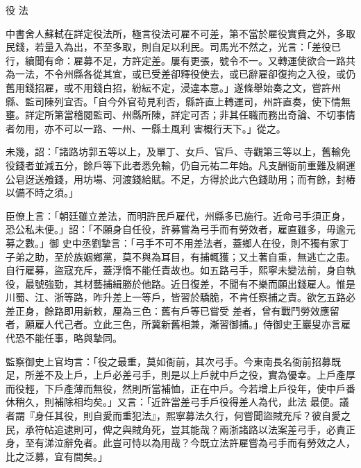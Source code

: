 
\begin{pinyinscope}

 役
 法



 中書舍人蘇軾在詳定役法所，極言役法可雇不可差，第不當於雇役實費之外，多取民錢，若量入為出，不至多取，則自足以利民。司馬光不然之，光言：「差役已
 行，續聞有命：雇募不足，方許定差。屢有更張，號令不一。又轉運使欲合一路共為一法，不令州縣各從其宜，或已受差卻釋役使去，或已辭雇卻復拘之入役，或仍舊用錢招雇，或不用錢白招，紛紜不定，浸違本意。」遂條舉始奏之文，嘗許州縣、監司陳列宜否。「自今外官茍見利否，縣許直上轉運司，州許直奏，使下情無壅。詳定所第當稽閱監司、州縣所陳，詳定可否；非其任職而務出奇論、不切事情者勿用，亦不可以一路、一州、一縣土風利
 害概行天下。」從之。



 未幾，詔：「諸路坊郭五等以上，及單丁、女戶、官戶、寺觀第三等以上，舊輸免役錢者並減五分，餘戶等下此者悉免輸，仍自元祐二年始。凡支酬衙前重難及綱運公皂迓送飧錢，用坊場、河渡錢給賦。不足，方得於此六色錢助用；而有餘，封樁以備不時之須。」



 臣僚上言：「朝廷雖立差法，而明許民戶雇代，州縣多已施行。近命弓手須正身，恐公私未便。」詔：「不願身自任役，許募嘗為弓手而有勞效者，雇直雖多，毋逾元募之數。」御
 史中丞劉摯言：「弓手不可不用差法者，蓋鄉人在役，則不獨有家丁子弟之助，至於族姻鄉黨，莫不與為耳目，有捕輒獲；又土著自重，無逃亡之患。自行雇募，盜寇充斥，蓋浮惰不能任責故也。如五路弓手，熙寧未變法前，身自執役，最號強勁，其材藝捕緝勝於他路。近日復差，不聞有不樂而願出錢雇人。惟是川蜀、江、浙等路，昨升差上一等戶，皆習於驕脆，不肯任察捕之責。欲乞五路必差正身，餘路即用新敕，厘為三色：舊有戶等已嘗受
 差者，曾有戰鬥勞效應留者，願雇人代己者。立此三色，所冀新舊相兼，漸習御捕。」侍御史王巖叟亦言雇代恐不能任事，略與摯同。



 監察御史上官均言：「役之最重，莫如衙前，其次弓手。今東南長名衙前招募既足，所差不及上戶，上戶必差弓手，則是以上戶就中戶之役，實為優幸。上戶產厚而役輕，下戶產薄而無役，然則所當補恤，正在中戶。今若增上戶役年，使中戶番休稍久，則補除相均矣。」又言：「近許當差弓手戶役得差人為代，此法
 最便。議者謂『身任其役，則自愛而重犯法』，熙寧募法久行，何嘗聞盜賊充斥？彼自愛之民，承符帖追逮則可，俾之與賊角死，豈其能哉？兩浙諸路以法案差弓手，必責正身，至有涕泣辭免者。此豈可恃以為用哉？今既立法許雇嘗為弓手而有勞效之人，比之泛募，宜有間矣。」




\end{pinyinscope}
